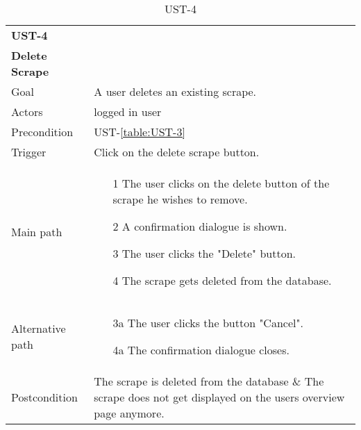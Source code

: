 \documentclass[titlepage, 12pt]{article}
\begin{document}
  \begin{table}[H]
    \begin{center}

      \begin{tabular}{p{4cm}|p{10cm}}
        \textbf{UST-4}\\ \textbf{Delete Scrape}                                            \\
        \hline
        Goal             & A user deletes an existing scrape.                  \\
        \hline
        Actors           & logged in user                                               \\
        \hline
        Precondition     & UST-\ref{table:UST-3}                                     \\
        \hline
        Trigger          & Click on the delete scrape button.                            \\
        \hline
        Main path        &
        \begin{itemize}
          \item [1] The user clicks on the delete button of the scrape he wishes to remove.
          \item [2] A confirmation dialogue is shown.
          \item [3] The user clicks the "Delete" button.
          \item [4] The scrape gets deleted from the database.
        \end{itemize}                                                         \\
        \hline
        Alternative path &
        \begin{itemize}
          \item [3a] The user clicks the button "Cancel".
          \item [4a] The confirmation dialogue closes.
        \end{itemize}                                                         \\
        \hline
        Postcondition    & The scrape is deleted from the database \& The scrape does not get displayed on the users overview page anymore. \\
      \end{tabular}

      \caption{UST-4}
      \label{table:UST-4}

    \end{center}
  \end{table}
\end{document}
